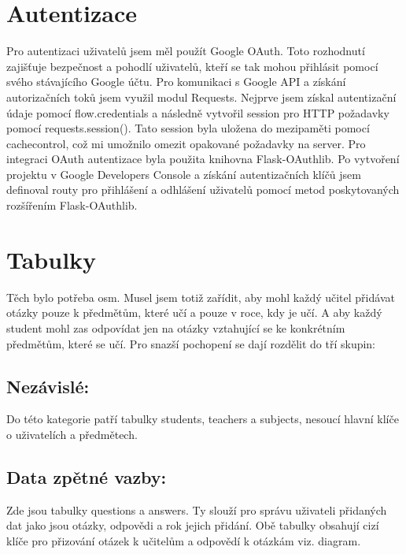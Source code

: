 \documentclass[11pt,a4paper,twoside,openright]{report}
\begin{document}
{\section{Autentizace}

Pro autentizaci uživatelů jsem měl použít Google OAuth. Toto rozhodnutí zajišťuje bezpečnost a pohodlí uživatelů, kteří se tak mohou přihlásit pomocí svého stávajícího Google účtu.
Pro komunikaci s Google API a získání autorizačních toků jsem využil modul Requests. Nejprve jsem získal autentizační údaje pomocí flow.credentials a následně vytvořil session pro HTTP požadavky pomocí requests.session(). Tato session byla uložena do mezipaměti pomocí cachecontrol, což mi umožnilo omezit opakované požadavky na server.
Pro integraci OAuth autentizace byla použita knihovna Flask-OAuthlib. Po vytvoření projektu v Google Developers Console a získání autentizačních klíčů jsem definoval routy pro přihlášení a odhlášení uživatelů pomocí metod poskytovaných rozšířením Flask-OAuthlib.

\section{Tabulky}
Těch bylo potřeba osm. Musel jsem totiž zařídit, aby mohl každý učitel přidávat otázky pouze k předmětům, které učí a pouze v roce, kdy je učí. A aby každý student mohl zas odpovídat jen na otázky vztahující se ke konkrétním předmětům, které se učí. Pro snazší pochopení se dají rozdělit do tří skupin:
\subsection{Nezávislé:}
Do této kategorie patří tabulky students, teachers a subjects, nesoucí hlavní klíče o uživatelích a předmětech.
\subsection{Data zpětné vazby:}
Zde jsou tabulky questions a answers. Ty slouží pro správu uživateli přidaných dat jako jsou otázky, odpovědi a rok jejich přidání. Obě tabulky obsahují cizí klíče pro přizování otázek k učitelům a odpovědí k otázkám viz. diagram.
}
\end{document}
